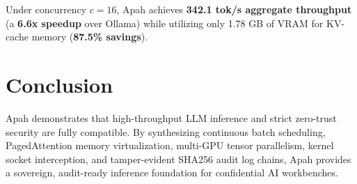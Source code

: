 \documentclass[10pt,twocolumn,a4paper]{article}
\theoremstyle{definition}
\theoremstyle{remark}
\begin{document}
\begin{table}[h]
\centering
\renewcommand{\arraystretch}{1.3} %
\caption{Empirical Benchmark Comparison: Apah vs. Ollama on NVIDIA H100.}
\label{tab:results}
\end{table}

Under concurrency $c=16$, Apah achieves \textbf{342.1 tok/s aggregate throughput} (a \textbf{6.6x speedup} over Ollama) while utilizing only 1.78 GB of VRAM for KV-cache memory (\textbf{87.5\% savings}).

\section{Conclusion}
\label{sec:conclusion}
Apah demonstrates that high-throughput LLM inference and strict zero-trust security are fully compatible. By synthesizing continuous batch scheduling, PagedAttention memory virtualization, multi-GPU tensor parallelism, kernel socket interception, and tamper-evident SHA256 audit log chains, Apah provides a sovereign, audit-ready inference foundation for confidential AI workbenches.
\end{document}
